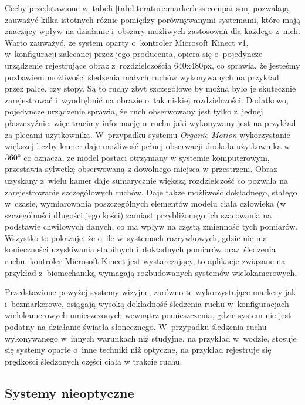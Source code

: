 Cechy przedstawione w~tabeli \ref{tab:literature:markerless:comparison} pozwalają zauważyć kilka istotnych różnic pomiędzy porównywanymi systemami, które mają znaczący wpływ na działanie i~obszary możliwych zastosowań dla każdego z~nich. Warto zauważyć, że system oparty o~kontroler Microsoft Kinect v1, w~konfiguracji zalecanej przez jego producenta, opiera się o~pojedyncze urządzenie rejestrujące obraz z~rozdzielczością 640x480px, co sprawia, że jesteśmy pozbawieni możliwości śledzenia małych ruchów wykonywanych na przykład przez palce, czy stopy. Są to ruchy zbyt szczegółowe by można było je skutecznie zarejestrować i~wyodrębnić na obrazie o~tak niskiej rozdzielczości. Dodatkowo, pojedyncze urządzenie sprawia, że ruch obserwowany jest tylko z~jednej płaszczyźnie, więc tracimy informację o~ruchu jaki wykonywany jest na przykład za plecami użytkownika. W~przypadku systemu \emph{Organic Motion} wykorzystanie większej liczby kamer daje możliwość pełnej obserwacji dookoła użytkownika w~$360\degree$ co oznacza, że model postaci otrzymany w systemie komputerowym, przestawia sylwetkę obserwowaną z dowolnego miejsca w przestrzeni. Obraz uzyskany z~wielu kamer daje sumarycznie większą rozdzielczość co pozwala na zarejestrowanie szczegółowych ruchów. Daje także możliwość dokładnego, stałego w~czasie, wymiarowania poszczególnych elementów modelu ciała człowieka (w szczególności długości jego kości) zamiast przybliżonego ich szacowania na podstawie chwilowych danych, co ma wpływ na częstą zmienność tych pomiarów. Wszystko to pokazuje, że o~ile w~systemach rozrywkowych, gdzie nie ma konieczności uzyskiwania stabilnych i~dokładnych pomiarów oraz~śledzenia ruchu, kontroler Microsoft Kinect jest wystarczający, to aplikacje związane na przykład z~biomechaniką wymagają rozbudowanych systemów wielokamerowych.
			
Przedstawione powyżej systemy wizyjne, zarówno te wykorzystujące markery jak i~bezmarkerowe, osiągają wysoką dokładność śledzenia ruchu w~konfiguracjach wielokamerowych umieszczonych wewnątrz pomieszczenia, gdzie system nie jest podatny na działanie światła słonecznego. W~przypadku śledzenia ruchu wykonywanego w~innych warunkach niż studyjne, na przykład w~wodzie, stosuje się systemy oparte o~inne techniki niż optyczne, na przykład rejestruje się prędkości śledzonych części ciała w trakcie ruchu.
			
\subsection{Systemy nieoptyczne}
			
